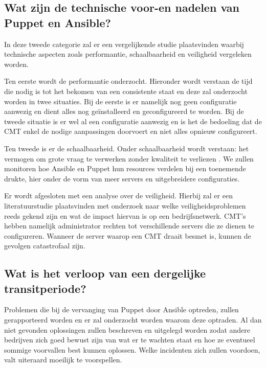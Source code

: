 \subsection{Wat zijn de technische voor-en nadelen van Puppet en Ansible?}

In deze tweede categorie zal er een vergelijkende studie plaatsvinden waarbij technische aspecten zoals performantie, schaalbaarheid en veiligheid vergeleken worden. 
 
 Ten eerste wordt de performantie onderzocht. Hieronder wordt verstaan de tijd die nodig is tot het bekomen van een consistente staat en deze zal onderzocht worden in twee situaties. Bij de eerste is er namelijk nog geen configuratie aanwezig en dient alles nog ge\"installeerd en geconfigureerd te worden. Bij de tweede situatie is er wel al een configuratie aanwezig en is het de bedoeling dat de CMT enkel de nodige aanpassingen doorvoert en niet alles opnieuw configureert. 

Ten tweede is er de schaalbaarheid. Onder schaalbaarheid wordt verstaan: het vermogen om grote vraag te verwerken zonder kwaliteit te verliezen \autocite{informit}. We zullen monitoren hoe Ansible en Puppet hun resources verdelen bij een toenemende drukte, hier onder de vorm van meer servers en uitgebreidere configuraties. 

Er wordt afgesloten met een analyse over de veiligheid. Hierbij zal er een literatuurstudie plaatsvinden met onderzoek naar welke veiligheidsproblemen reeds gekend zijn en wat de impact hiervan is op een bedrijfsnetwerk. CMT's hebben namelijk  administrator rechten tot verschillende servers die ze dienen te configureren. Wanneer de server waarop een CMT draait besmet is, kunnen de gevolgen catastrofaal zijn.

\subsection{Wat is het verloop van een dergelijke transitperiode?}

Problemen die bij de vervanging van Puppet door Ansible optreden, zullen gerapporteerd worden en er zal onderzocht worden waarom deze optraden. Al dan niet gevonden oplossingen zullen beschreven en uitgelegd worden zodat andere bedrijven zich goed bewust zijn van wat er te wachten staat en hoe ze eventueel sommige voorvallen best kunnen oplossen. Welke incidenten zich zullen voordoen, valt uiteraard moeilijk te voorspellen. 




